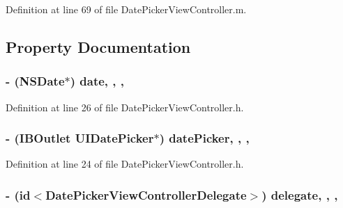 Definition at line 69 of file Date\-Picker\-View\-Controller.\-m.



\subsection{Property Documentation}
\hypertarget{interface_date_picker_view_controller_ae9db038d9affbbcb22dd7d0823c577d7}{
\subsubsection[{date}]{\setlength{\rightskip}{0pt plus 5cm}-\/ (N\-S\-Date$\ast$) date\hspace{0.3cm}{\ttfamily [read]}, {\ttfamily [write]}, {\ttfamily [nonatomic]}, {\ttfamily [strong]}}}\label{interface_date_picker_view_controller_ae9db038d9affbbcb22dd7d0823c577d7}


Definition at line 26 of file Date\-Picker\-View\-Controller.\-h.

\hypertarget{interface_date_picker_view_controller_ad145f10f3b16d414b7af1324020ecfd5}{
\subsubsection[{date\-Picker}]{\setlength{\rightskip}{0pt plus 5cm}-\/ (I\-B\-Outlet U\-I\-Date\-Picker$\ast$) date\-Picker\hspace{0.3cm}{\ttfamily [read]}, {\ttfamily [write]}, {\ttfamily [nonatomic]}, {\ttfamily [strong]}}}\label{interface_date_picker_view_controller_ad145f10f3b16d414b7af1324020ecfd5}


Definition at line 24 of file Date\-Picker\-View\-Controller.\-h.

\hypertarget{interface_date_picker_view_controller_a2e535fb7e3256251db35c4429ac5b32e}{
\subsubsection[{delegate}]{\setlength{\rightskip}{0pt plus 5cm}-\/ (id$<${\bf Date\-Picker\-View\-Controller\-Delegate}$>$) delegate\hspace{0.3cm}{\ttfamily [read]}, {\ttfamily [write]}, {\ttfamily [nonatomic]}, {\ttfamily [weak]}}}\label{interface_date_picker_view_controller_a2e535fb7e3256251db35c4429ac5b32e}


